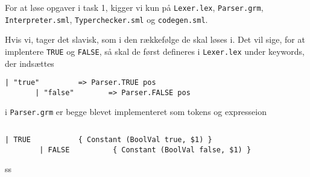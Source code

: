 \documentclass[11pt,a4paper,oneside]{report}
\begin{document}

\setcounter{page}{0}
\renewcommand\thepage{\roman{page}}



\tableofcontents

\newpage

\setcounter{page}{1}
\renewcommand\thepage{\arabic{page}}


For at løse opgaver i task 1, kigger vi kun på \texttt{Lexer.lex}, \texttt{Parser.grm}, \texttt{Interpreter.sml}, \texttt{Typerchecker.sml} og \texttt{codegen.sml}.

Hvis vi, tager det slavisk, som i den rækkefølge de skal løses i. Det vil sige, for at implentere \texttt{TRUE} og \texttt{FALSE}, så skal de først defineres i \texttt{Lexer.lex} under keywords, der indsættes
\begin{lstlisting}[firstnumber=42]
       | "true"         => Parser.TRUE pos
       | "false"        => Parser.FALSE pos
\end{lstlisting}
i \texttt{Parser.grm} er begge blevet implementeret som tokens og expresseion
\begin{lstlisting}[firstnumber=13]
%token <(int*int)> TRUE FALSE
\end{lstlisting}
\begin{lstlisting}[mathescape=false,firstnumber=68]
        | TRUE           { Constant (BoolVal true, $1) }
        | FALSE          { Constant (BoolVal false, $1) }
\end{lstlisting}
ss





\clearpage
{}


\end{document}
